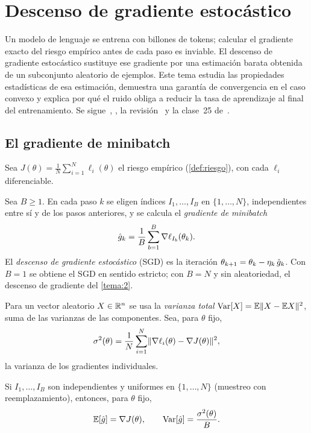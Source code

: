 \chapter{Descenso de gradiente estocástico}
\label{tema:3}

Un modelo de lenguaje se entrena con billones de tokens; calcular el gradiente exacto del riesgo empírico antes de cada paso es inviable. El descenso de gradiente estocástico sustituye ese gradiente por una estimación barata obtenida de un subconjunto aleatorio de ejemplos. Este tema estudia las propiedades estadísticas de esa estimación, demuestra una garantía de convergencia en el caso convexo y explica por qué el ruido obliga a reducir la tasa de aprendizaje al final del entrenamiento. Se sigue~\cite[§12.4 y §12.5]{d2l}, \cite[§8.1.3 y §8.3.1]{gbc}, la revisión~\cite{bottou} y la clase~25 de~\cite{mit18065}.

\section{El gradiente de minibatch}

Sea $J(\theta)=\frac1N\sum_{i=1}^{N}\ell_i(\theta)$ el riesgo empírico (\cref{def:riesgo}), con cada $\ell_i$ diferenciable.

\begin{definicion}\label{def:sgd}
Sea $B\ge 1$. En cada paso $k$ se eligen índices $I_1,\dots,I_B$ en $\{1,\dots,N\}$, independientes entre sí y de los pasos anteriores, y se calcula el \emph{gradiente de minibatch}
\[
\hat g_k=\frac1B\sum_{b=1}^{B}\nabla\ell_{I_b}(\theta_k).
\]
El \emph{descenso de gradiente estocástico} (SGD) es la iteración $\theta_{k+1}=\theta_k-\eta_k\,\hat g_k$. Con $B=1$ se obtiene el SGD en sentido estricto; con $B=N$ y sin aleatoriedad, el descenso de gradiente del \cref{tema:2}.
\end{definicion}

Para un vector aleatorio $X\in\mathbb{R}^{n}$ se usa la \emph{varianza total} $\operatorname{Var}[X]=\mathbb{E}\lVert X-\mathbb{E} X\rVert^{2}$, suma de las varianzas de las componentes. Sea, para $\theta$ fijo,
\[
\sigma^{2}(\theta)=\frac1N\sum_{i=1}^{N}\lVert\nabla\ell_i(\theta)-\nabla J(\theta)\rVert^{2},
\]
la varianza de los gradientes individuales.

\begin{teorema}\label{teo:minibatch}
Si $I_1,\dots,I_B$ son independientes y uniformes en $\{1,\dots,N\}$ (muestreo con reemplazamiento), entonces, para $\theta$ fijo,
\[
\mathbb{E}[\hat g]=\nabla J(\theta),\qquad\operatorname{Var}[\hat g]=\frac{\sigma^{2}(\theta)}{B}.
\]
\end{teorema}

